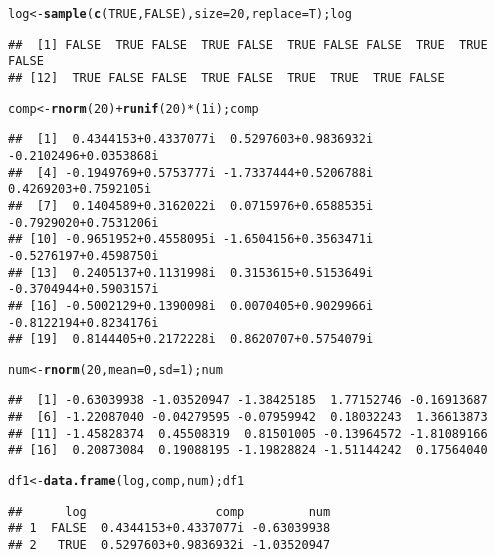 \documentclass[10pt,a4paper]{article}\usepackage[]{graphicx}\usepackage[]{color}
\makeatletter
\newcommand{\hlnum}[1]{\textcolor[rgb]{0.686,0.059,0.569}{#1}}%
\newcommand{\hlopt}[1]{\textcolor[rgb]{0,0,0}{#1}}%
\newcommand{\hlstd}[1]{\textcolor[rgb]{0.345,0.345,0.345}{#1}}%
\newcommand{\hlkwb}[1]{\textcolor[rgb]{0.69,0.353,0.396}{#1}}%
\newcommand{\hlkwc}[1]{\textcolor[rgb]{0.333,0.667,0.333}{#1}}%
\newcommand{\hlkwd}[1]{\textcolor[rgb]{0.737,0.353,0.396}{\textbf{#1}}}%
\newenvironment{kframe}{%
 \def\at@end@of@kframe{}%
 \ifinner\ifhmode%
  \def\at@end@of@kframe{\end{minipage}}%
  \begin{minipage}{\columnwidth}%
 \fi\fi%
 \def\FrameCommand##1{\hskip\@totalleftmargin \hskip-\fboxsep
 \colorbox{shadecolor}{##1}\hskip-\fboxsep
     \hskip-\linewidth \hskip-\@totalleftmargin \hskip\columnwidth}%
 \MakeFramed {\advance\hsize-\width
   \@totalleftmargin\z@ \linewidth\hsize
   \@setminipage}}%
 {\par\unskip\endMakeFramed%
 \at@end@of@kframe}
\newenvironment{knitrout}{}{} %
\makeatother
\begin{document}
\begin{knitrout}
\color{fgcolor}\begin{kframe}
\begin{alltt}
\hlstd{log} \hlkwb{<-} \hlkwd{sample}\hlstd{(}\hlkwd{c}\hlstd{(}\hlnum{TRUE}\hlstd{,} \hlnum{FALSE}\hlstd{),} \hlkwc{size} \hlstd{=} \hlnum{20}\hlstd{,} \hlkwc{replace} \hlstd{= T); log}
\end{alltt}
\begin{verbatim}
##  [1] FALSE  TRUE FALSE  TRUE FALSE  TRUE FALSE FALSE  TRUE  TRUE FALSE
## [12]  TRUE FALSE FALSE  TRUE FALSE  TRUE  TRUE  TRUE FALSE
\end{verbatim}
\begin{alltt}
\hlstd{comp} \hlkwb{<-} \hlkwd{rnorm}\hlstd{(}\hlnum{20}\hlstd{)} \hlopt{+} \hlkwd{runif}\hlstd{(}\hlnum{20}\hlstd{)} \hlopt{*} \hlstd{(}\hlnum{1i}\hlstd{); comp}
\end{alltt}
\begin{verbatim}
##  [1]  0.4344153+0.4337077i  0.5297603+0.9836932i -0.2102496+0.0353868i
##  [4] -0.1949769+0.5753777i -1.7337444+0.5206788i  0.4269203+0.7592105i
##  [7]  0.1404589+0.3162022i  0.0715976+0.6588535i -0.7929020+0.7531206i
## [10] -0.9651952+0.4558095i -1.6504156+0.3563471i -0.5276197+0.4598750i
## [13]  0.2405137+0.1131998i  0.3153615+0.5153649i -0.3704944+0.5903157i
## [16] -0.5002129+0.1390098i  0.0070405+0.9029966i -0.8122194+0.8234176i
## [19]  0.8144405+0.2172228i  0.8620707+0.5754079i
\end{verbatim}
\begin{alltt}
\hlstd{num} \hlkwb{<-} \hlkwd{rnorm}\hlstd{(}\hlnum{20}\hlstd{,} \hlkwc{mean}\hlstd{=}\hlnum{0}\hlstd{,} \hlkwc{sd}\hlstd{=}\hlnum{1}\hlstd{); num}
\end{alltt}
\begin{verbatim}
##  [1] -0.63039938 -1.03520947 -1.38425185  1.77152746 -0.16913687
##  [6] -1.22087040 -0.04279595 -0.07959942  0.18032243  1.36613873
## [11] -1.45828374  0.45508319  0.81501005 -0.13964572 -1.81089166
## [16]  0.20873084  0.19088195 -1.19828824 -1.51144242  0.17564040
\end{verbatim}
\begin{alltt}
\hlstd{df1} \hlkwb{<-} \hlkwd{data.frame}\hlstd{(log, comp, num); df1}
\end{alltt}
\begin{verbatim}
##      log                  comp         num
## 1  FALSE  0.4344153+0.4337077i -0.63039938
## 2   TRUE  0.5297603+0.9836932i -1.03520947

\end{verbatim}
\end{kframe}
\end{knitrout}
\end{document}
